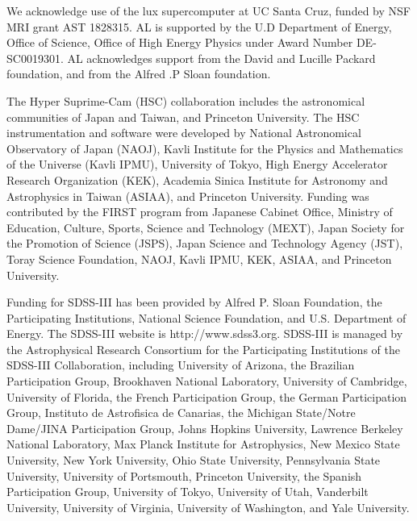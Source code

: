 \documentclass[a4paper,fleqn,usenatbib]{mnras}
\begin{document}
  We acknowledge use of the lux supercomputer at UC Santa Cruz, funded by NSF MRI grant AST
  1828315. AL is supported by the U.D Department of Energy, Office of Science, Office of High
  Energy Physics under Award Number DE-SC0019301. AL acknowledges support from the David and
  Lucille Packard foundation, and from the Alfred .P Sloan foundation.

  The Hyper Suprime-Cam (HSC) collaboration includes the astronomical communities of 
  Japan and Taiwan, and Princeton University.  The HSC instrumentation and software were
  developed by National Astronomical Observatory of Japan (NAOJ), Kavli Institute
  for the Physics and Mathematics of the Universe (Kavli IPMU), University of Tokyo,
  High Energy Accelerator Research Organization (KEK), Academia Sinica Institute
  for Astronomy and Astrophysics in Taiwan (ASIAA), and Princeton University.  
  Funding was contributed by the FIRST program from Japanese Cabinet Office,  Ministry 
  of Education, Culture, Sports, Science and Technology (MEXT), Japan Society for 
  the Promotion of Science (JSPS), Japan Science and Technology Agency (JST), Toray 
  Science Foundation, NAOJ, Kavli IPMU, KEK, ASIAA, and Princeton University.
   
  Funding for SDSS-III has been provided by Alfred P. Sloan Foundation, the 
  Participating Institutions, National Science Foundation, and U.S. Department of
  Energy. The SDSS-III website is http://www.sdss3.org.  SDSS-III is managed by the
  Astrophysical Research Consortium for the Participating Institutions of the SDSS-III
  Collaboration, including University of Arizona, the Brazilian Participation Group,
  Brookhaven National Laboratory, University of Cambridge, University of Florida, the
  French Participation Group, the German Participation Group, Instituto de Astrofisica
  de Canarias, the Michigan State/Notre Dame/JINA Participation Group, Johns Hopkins
  University, Lawrence Berkeley National Laboratory, Max Planck Institute for
  Astrophysics, New Mexico State University, New York University, Ohio State University,
  Pennsylvania State University, University of Portsmouth, Princeton University, the
  Spanish Participation Group, University of Tokyo, University of Utah, Vanderbilt
  University, University of Virginia, University of Washington, and Yale University.
  
\end{document}

